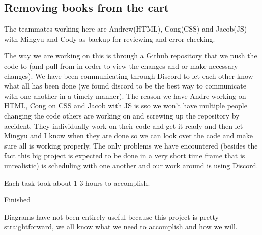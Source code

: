 \documentclass[12pt]{article}
\begin{document}
		\subsection{Removing books from the cart}
		\begin{iterate}

		\item The teammates working here are Andrew(HTML), Cong(CSS) and Jacob(JS) with Mingyu and Cody as backup for reviewing and error checking.

		\item The way we are working on this is through a Github repository that we push the code to (and pull from in order to view the changes and or make necessary changes).  We have been communicating through Discord to let each other know what all has been done (we found discord to be the best way to communicate with one another in a timely manner).  The reason we have Andre working on HTML, Cong on CSS and Jacob with JS is sso we won’t have multiple people changing the code others are working on and screwing up the repository by accident.  They individually work on their code and get it ready and then let Mingyu and I know when they are done so we can look over the code and make sure all is working properly.  The only problems we have encountered (besides the fact this big project is expected to be done in a very short time frame that is unrealistic) is scheduling with one another and our work around is using Discord.

		\item Each task took about 1-3 hours to accomplish.

		\item Finished

		\item Diagrams have not been entirely useful because this project is pretty straightforward, we all know what we need to accomplish and how we will.

		\end{iterate}
\end{document}
